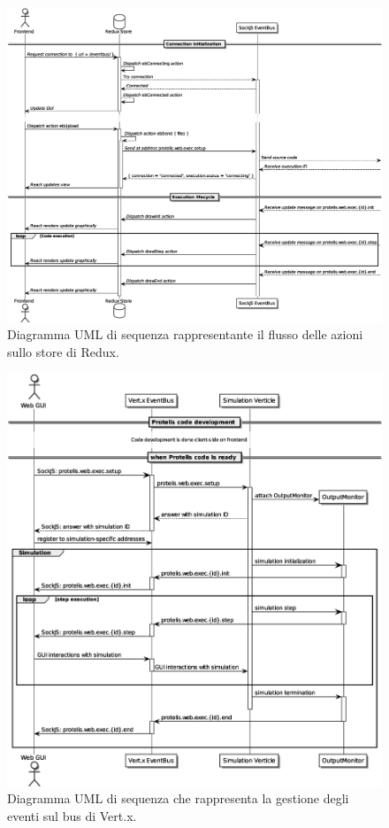       \begin{figure}[htbp]
        \centering
        \includegraphics[width=.9\textwidth]{res/uml/redux-eventbus.eps}%
        \caption{Diagramma UML di sequenza rappresentante il flusso delle azioni sullo store di Redux.}%
        \label{fig:event:redux}
      \end{figure}

      \begin{figure}[htbp]
        \centering
        \includegraphics[width=.9\textwidth]{res/uml/data-flow.eps}%
        \caption{Diagramma UML di sequenza che rappresenta la gestione degli eventi sul bus di Vert.x.}%
        \label{fig:event:vertx}
      \end{figure}
